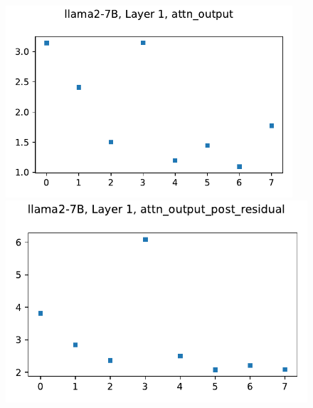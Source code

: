 \begin{figure}[H]
\centering
\begin{minipage}{.32\textwidth}
\centering
    \includegraphics[width=0.95\textwidth]{Figures/Summer/layer_1_attn_output.pdf}
\end{minipage}
\begin{minipage}{.32\textwidth}
    \centering
    \includegraphics[width=.95\textwidth]{Figures/Summer/layer_1_attn_output_post_residual.pdf}
\end{minipage}

\end{figure}
